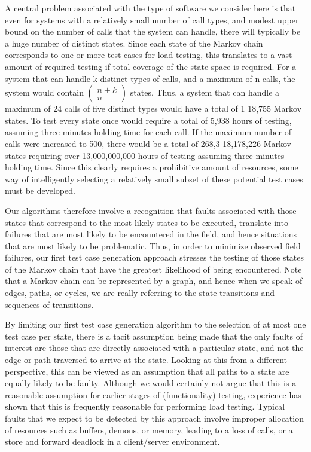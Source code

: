 \documentclass[journal, twoside]{IEEEtran}
\begin{document}
A central problem associated with the type of software we
consider here is that even for systems with a relatively small number of call types, and modest upper bound on the number
of calls that the system can handle, there will typically be a
huge number of distinct states. Since each state of the Markov
chain corresponds to one or more test cases for load testing,
this translates to a vast amount of required testing if total coverage of the state space is required. For a system that can handle k distinct types of calls, and a maximum of n calls, the
system would contain   
$\begin{pmatrix}
n+k \\
n
\end{pmatrix}$  states. Thus, a system that can
handle a maximum of 24 calls of five distinct types would
have a total of 1 18,755 Markov states. To test every state once
would require a total of 5,938 hours of testing, assuming three
minutes holding time for each call. If the maximum number of
calls were increased to 500, there would be a total of
268,3 18,178,226 Markov states requiring over 13,000,000,000
hours of testing assuming three minutes holding time. Since
this clearly requires a prohibitive amount of resources, some
way of intelligently selecting a relatively small subset of these
potential test cases must be developed. 

Our algorithms therefore involve a recognition that faults
associated with those states that correspond to the most likely
states to be executed, translate into failures that are most likely
to be encountered in the field, and hence situations that are
most likely to be problematic. Thus, in order to minimize observed field failures, our first test case generation approach
stresses the testing of those states of the Markov chain that
have the greatest likelihood of being encountered. Note that a
Markov chain can be represented by a graph, and hence when
we speak of edges, paths, or cycles, we are really referring to
the state transitions and sequences of transitions.

By limiting our first test case generation algorithm to the
selection of at most one test case per state, there is a tacit assumption being made that the only faults of interest are those
that are directly associated with a particular state, and not the
edge or path traversed to arrive at the state. Looking at this
from a different perspective, this can be viewed as an assumption that all paths to a state are equally likely to be faulty. Although we would certainly not argue that this is a reasonable
assumption for earlier stages of (functionality) testing, experience has shown that this is frequently reasonable for performing load testing. Typical faults that we expect to be detected by
this approach involve improper allocation of resources such as
buffers, demons, or memory, leading to a loss of calls, or a
store and forward deadlock in a client/server environment.
\end{document}
